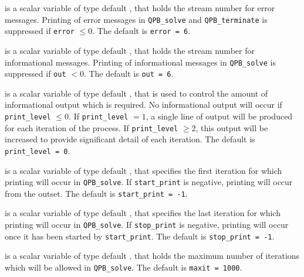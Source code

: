 \begin{description}

 is a scalar variable of type default \integer, that holds the
stream number for error messages. Printing of error messages in 
{\tt QPB\_solve} and {\tt QPB\_terminate} 
is suppressed if {\tt error} $\leq 0$.
The default is {\tt error = 6}.

 is a scalar variable of type default \integer, that holds the
stream number for informational messages. Printing of informational messages in 
{\tt QPB\_solve} is suppressed if {\tt out} $< 0$.
The default is {\tt out = 6}.

 is a scalar variable of type default \integer, that is used
to control the amount of informational output which is required. No 
informational output will occur if {\tt print\_level} $\leq 0$. If 
{\tt print\_level} $= 1$, a single line of output will be produced for each
iteration of the process. If {\tt print\_level} $\geq 2$, this output will be
increased to provide significant detail of each iteration.
The default is {\tt print\_level = 0}.

 is a scalar variable of type default \integer, that specifies
the first iteration for which printing will occur in {\tt QPB\_solve}.
If {\tt start\_print} is negative, printing will occur from the outset.
The default is {\tt start\_print = -1}.

 is a scalar variable of type default \integer, that specifies
the last iteration for which printing will occur in  {\tt QPB\_solve}.
If {\tt stop\_print} is negative, printing will occur once it has been 
started by {\tt start\_print}.
The default is {\tt stop\_print = -1}.

 is a scalar variable of type default \integer, that holds the
maximum number of iterations which will be allowed in {\tt QPB\_solve}.
The default is {\tt maxit = 1000}.




\end{description}
